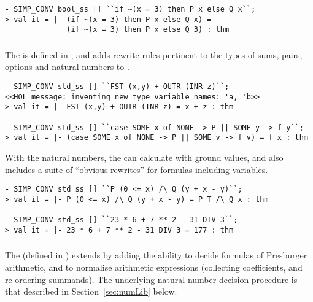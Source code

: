 {\begin{session}
\begin{hol}
\begin{verbatim}
- SIMP_CONV bool_ss [] ``if ~(x = 3) then P x else Q x``;
> val it = |- (if ~(x = 3) then P x else Q x) =
              (if ~(x = 3) then P x else Q 3) : thm
\end{verbatim}
\end{hol}
\end{session}

\subsubsection{}
%
%
The  \simpset{} is defined in , and adds
rewrite rules pertinent to the types of sums, pairs, options and
natural numbers to .
\begin{session}
\begin{hol}
\begin{verbatim}
- SIMP_CONV std_ss [] ``FST (x,y) + OUTR (INR z)``;
<<HOL message: inventing new type variable names: 'a, 'b>>
> val it = |- FST (x,y) + OUTR (INR z) = x + z : thm

- SIMP_CONV std_ss [] ``case SOME x of NONE -> P || SOME y -> f y``;
> val it = |- (case SOME x of NONE -> P || SOME v -> f v) = f x : thm
\end{verbatim}
\end{hol}
\end{session}

With the natural numbers, the  \simpset{} can calculate
with ground values, and also includes a suite of ``obvious rewrites''
for formulas including variables.
\begin{session}
\begin{hol}
\begin{verbatim}
- SIMP_CONV std_ss [] ``P (0 <= x) /\ Q (y + x - y)``;
> val it = |- P (0 <= x) /\ Q (y + x - y) = P T /\ Q x : thm

- SIMP_CONV std_ss [] ``23 * 6 + 7 ** 2 - 31 DIV 3``;
> val it = |- 23 * 6 + 7 ** 2 - 31 DIV 3 = 177 : thm
\end{verbatim}
\end{hol}
\end{session}

\subsubsection{}
%
%
The  \simpset{} (defined in ) extends
 by adding the ability to decide formulas of Presburger
arithmetic, and to normalise arithmetic expressions (collecting
coefficients, and re-ordering summands).  The underlying natural
number decision procedure is that described in
Section~\ref{sec:numLib} below.

}
